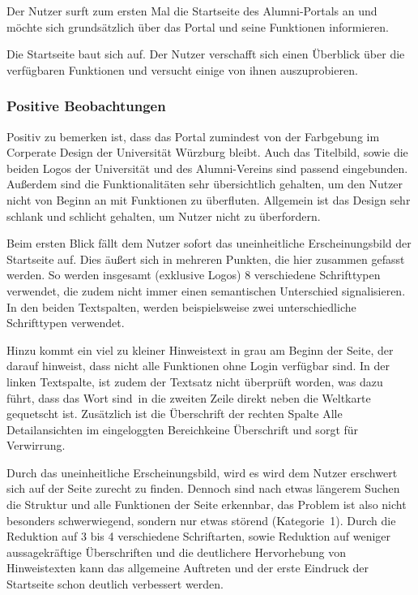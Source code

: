Der Nutzer surft zum ersten Mal die Startseite des Alumni-Portals an und möchte sich grundsätzlich über das Portal und seine Funktionen informieren. 

Die Startseite baut sich auf. Der Nutzer verschafft sich einen Überblick über die verfügbaren Funktionen und versucht einige von ihnen auszuprobieren.

\subsubsection*{Positive Beobachtungen}
Positiv zu bemerken ist, dass das Portal zumindest von der Farbgebung im Corperate Design der Universität Würzburg bleibt. 
Auch das Titelbild, sowie die beiden Logos der Universität und des Alumni-Vereins sind passend eingebunden.
Außerdem sind die Funktionalitäten sehr übersichtlich gehalten, um den Nutzer nicht von Beginn an mit Funktionen zu überfluten. 
Allgemein ist das Design sehr schlank und schlicht gehalten, um Nutzer nicht zu überfordern. 

{Beim ersten Blick fällt dem Nutzer sofort das uneinheitliche Erscheinungsbild der Startseite auf. Dies äußert sich in mehreren Punkten, die hier zusammen gefasst werden. 
So werden insgesamt (exklusive Logos) 8 verschiedene Schrifttypen verwendet, die zudem nicht immer einen semantischen Unterschied signalisieren. In den beiden Textspalten, werden beispielsweise zwei unterschiedliche Schrifttypen verwendet. 

Hinzu kommt ein viel zu kleiner Hinweistext in grau am Beginn der Seite, der darauf hinweist, dass nicht alle Funktionen ohne Login verfügbar sind.
In der linken Textspalte, ist zudem der Textsatz nicht überprüft worden, was dazu führt, dass das Wort \glqq sind\grqq~in die zweiten Zeile direkt neben die Weltkarte gequetscht ist.
Zusätzlich ist die Überschrift der rechten Spalte \glqq Alle Detailansichten im eingeloggten Bereich\grqq keine Überschrift und sorgt für Verwirrung.
}
{Durch das uneinheitliche Erscheinungsbild, wird es wird dem Nutzer erschwert sich auf der Seite zurecht zu finden. Dennoch sind nach etwas längerem Suchen die Struktur und alle Funktionen der Seite erkennbar, das Problem ist also nicht besonders schwerwiegend, sondern nur etwas störend (Kategorie~1).
}
{Durch die Reduktion auf 3 bis 4 verschiedene Schriftarten, sowie Reduktion auf weniger aussagekräftige Überschriften und die deutlichere Hervorhebung von Hinweistexten kann das allgemeine Auftreten und der erste Eindruck der Startseite schon deutlich verbessert werden.
}\label{prob:start:erschbild}

